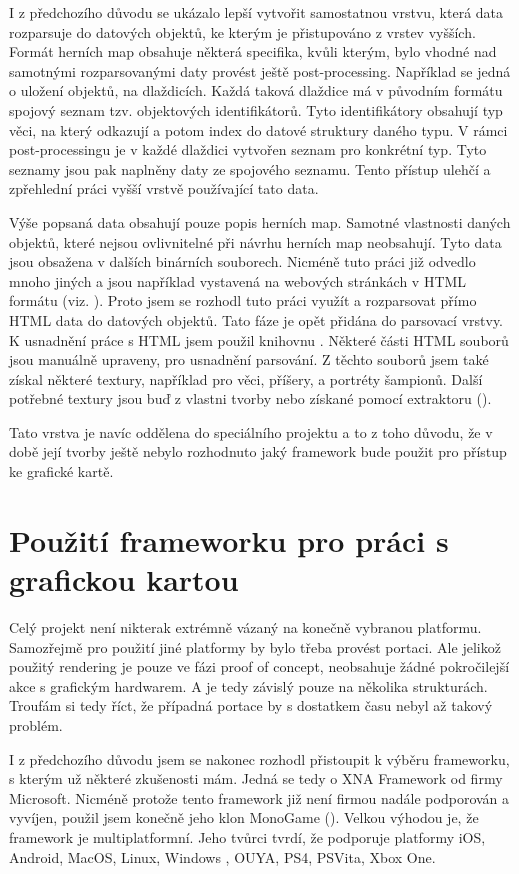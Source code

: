 I z předchozího důvodu se ukázalo lepší vytvořit samostatnou vrstvu, která data rozparsuje do datových objektů, ke kterým
je přistupováno z vrstev vyšších. Formát herních map obsahuje některá specifika, kvůli kterým, bylo vhodné nad samotnými
rozparsovanými daty provést ještě post-processing. Například se jedná o uložení objektů, na dlaždicích. Každá taková dlaždice
má v původním formátu spojový seznam tzv. objektových identifikátorů. Tyto identifikátory obsahují typ věci, na který odkazují
a potom index do datové struktury daného typu. V rámci post-processingu je v každé dlaždici vytvořen seznam pro konkrétní typ.
Tyto seznamy jsou pak naplněny daty ze spojového seznamu. Tento přístup ulehčí a zpřehlední práci vyšší vrstvě používající tato
data.

Výše popsaná data obsahují pouze popis herních map. Samotné vlastnosti daných objektů, které nejsou ovlivnitelné při návrhu
herních map neobsahují. Tyto data jsou obsažena v dalších binárních souborech. Nicméně tuto práci již odvedlo mnoho jiných a 
jsou například vystavená na webových stránkách v HTML formátu (viz. \cite{HtmlDataFontanel05}). Proto jsem se rozhodl tuto 
práci využít a rozparsovat přímo HTML data do datových objektů. Tato fáze je opět přidána do parsovací vrstvy. K usnadnění 
práce s HTML jsem použil knihovnu \citet{HtmlAgilityPack}. Některé části HTML souborů jsou manuálně upraveny, pro usnadnění
parsování. Z těchto souborů jsem také získal některé textury, například pro věci, příšery, a portréty šampionů. Další potřebné
textury jsou buď z vlastni tvorby nebo získané pomocí extraktoru (\citet{TextureExtractor}). 

Tato vrstva je navíc oddělena do speciálního projektu a to z toho důvodu, že v době její tvorby ještě nebylo rozhodnuto jaký framework
bude použit pro přístup ke grafické kartě.

\section{Použití frameworku pro práci s grafickou kartou}
Celý projekt není nikterak extrémně vázaný na konečně vybranou platformu. Samozřejmě pro použití jiné platformy by bylo 
třeba provést portaci. Ale jelikož použitý rendering je pouze ve fázi proof of concept, neobsahuje žádné pokročilejší akce
s grafickým hardwarem. A je tedy závislý pouze na několika strukturách. Troufám si tedy říct, že případná portace by s dostatkem
času nebyl až takový problém.

I z předchozího důvodu jsem se nakonec rozhodl přistoupit k výběru frameworku, s kterým už některé zkušenosti mám. Jedná se 
tedy o XNA Framework od firmy Microsoft. Nicméně protože tento framework již není firmou nadále podporován a vyvíjen, použil jsem 
konečně jeho klon MonoGame (\citet{MonoGame}). Velkou výhodou je, že framework je multiplatformní. Jeho tvůrci tvrdí, že podporuje platformy
iOS, Android, MacOS, Linux, Windows , OUYA, PS4, PSVita, Xbox One.

